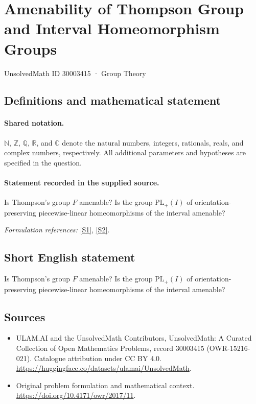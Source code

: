 \documentclass[11pt]{article}
\newcommand{\sref}[2]{\hyperlink{source:#1:#2}{[S#2]}}
\begin{document}
\setcounter{section}{30003414}
\section{Amenability of Thompson Group and Interval Homeomorphism Groups}\label{30003415}
{\small UnsolvedMath ID 30003415 · Group Theory}
\subsection{Definitions and mathematical statement}

\paragraph{Shared notation.}$\mathbb N$, $\mathbb Z$, $\mathbb Q$, $\mathbb R$, and $\mathbb C$ denote the natural numbers, integers, rationals, reals, and complex numbers, respectively. All additional parameters and hypotheses are specified in the question.


\paragraph{Statement recorded in the supplied source.}
Is Thompson's group $F$ amenable? Is the group $\mathrm{PL}_+(I)$ of orientation-preserving piecewise-linear homeomorphisms of the interval amenable?
\par\smallskip\textit{Formulation references:} \sref{30003415}{1}, \sref{30003415}{2}.
\subsection{Short English statement}
Is Thompson's group $F$ amenable? Is the group $\mathrm{PL}_+(I)$ of orientation-preserving piecewise-linear homeomorphisms of the interval amenable?
\subsection{Sources}
\begin{itemize}
\item[\hypertarget{source:30003415:1}{S1}] ULAM.AI and the UnsolvedMath Contributors, UnsolvedMath: A Curated Collection of Open Mathematics Problems, record 30003415 (OWR-15216-021). Catalogue attribution under CC BY 4.0.
\url{https://huggingface.co/datasets/ulamai/UnsolvedMath}.
\item[\hypertarget{source:30003415:2}{S2}] Original problem formulation and mathematical context.
\url{https://doi.org/10.4171/owr/2017/11}.
\end{itemize}
\label{end:30003415}
\end{document}
